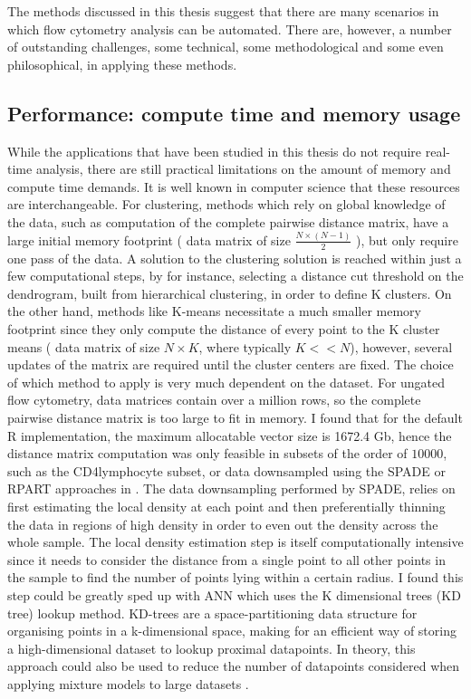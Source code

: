 The methods discussed in this thesis suggest that there are many scenarios in which flow cytometry analysis can be automated.
There are, however, a number of outstanding challenges, some technical, some methodological and some even philosophical, in applying these methods.


\subsection{Performance: compute time and memory usage}
While the applications that have been studied in this thesis do not require real-time analysis, there are still practical limitations on the amount of memory and compute time demands.
It is well known in computer science that these resources are interchangeable.
For clustering, methods which rely on global knowledge of the data, such as computation of the complete pairwise distance matrix, have a large initial memory footprint ( data matrix of size $\frac{N \times (N-1)}{2}$ ), but only require one pass of the data.
A solution to the clustering solution is reached within just a few computational steps, by for instance,
selecting a distance cut threshold on the dendrogram, built from hierarchical clustering, in order to define K clusters. 
On the other hand, methods like K-means necessitate a much smaller memory footprint since they only compute the distance of every point to the K cluster means ( data matrix of size $N \times K$, where typically $K << N$), however, several updates of the matrix are required until the cluster centers are fixed.
The choice of which method to apply is very much dependent on the dataset.
For ungated flow cytometry, data matrices  contain over a million rows, so the complete pairwise distance matrix is too large to fit in memory.
I found that for the default R implementation, the maximum allocatable vector size is 1672.4 Gb, hence the distance matrix computation was only feasible in subsets of the order of $10000$, such as the CD4\positive lymphocyte subset, or data downsampled using the SPADE or RPART approaches in .
The data downsampling performed by SPADE, relies on first estimating the local density at each point and then preferentially thinning the data in regions of high density in order to even out the density across the whole sample.
The local density estimation step is itself computationally intensive since it needs to consider the distance from a single point to all other points in the sample to find the number of points lying within a certain radius.
I found this step could be greatly sped up with \acrfull{ANN} which uses the K dimensional trees (KD tree) lookup method.
KD-trees are a space-partitioning data structure for organising points in a k-dimensional space, making for an efficient way of storing a high-dimensional dataset to lookup proximal datapoints.
In theory, this approach could also be used to reduce the number of datapoints considered when applying mixture models to large datasets \citep{McLachlan:2004uw}.

